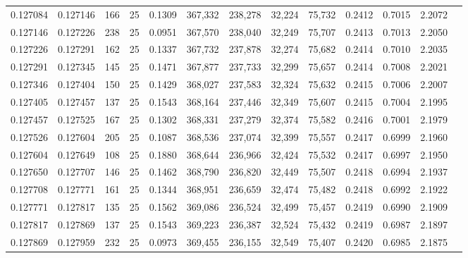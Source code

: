 \begin{tabular}{rrrrrrrrrrrrr}
0.127084 & 0.127146 &   166 &  25 &                                     0.1309 & 367,332 & 238,278 &  32,224 &  75,732 & 0.2412 & 0.7015 & 2.2072 \\
0.127146 & 0.127226 &   238 &  25 &                                     0.0951 & 367,570 & 238,040 &  32,249 &  75,707 & 0.2413 & 0.7013 & 2.2050 \\
0.127226 & 0.127291 &   162 &  25 &                                     0.1337 & 367,732 & 237,878 &  32,274 &  75,682 & 0.2414 & 0.7010 & 2.2035 \\
0.127291 & 0.127345 &   145 &  25 &                                     0.1471 & 367,877 & 237,733 &  32,299 &  75,657 & 0.2414 & 0.7008 & 2.2021 \\
0.127346 & 0.127404 &   150 &  25 &                                     0.1429 & 368,027 & 237,583 &  32,324 &  75,632 & 0.2415 & 0.7006 & 2.2007 \\
0.127405 & 0.127457 &   137 &  25 &                                     0.1543 & 368,164 & 237,446 &  32,349 &  75,607 & 0.2415 & 0.7004 & 2.1995 \\
0.127457 & 0.127525 &   167 &  25 &                                     0.1302 & 368,331 & 237,279 &  32,374 &  75,582 & 0.2416 & 0.7001 & 2.1979 \\
0.127526 & 0.127604 &   205 &  25 &                                     0.1087 & 368,536 & 237,074 &  32,399 &  75,557 & 0.2417 & 0.6999 & 2.1960 \\
0.127604 & 0.127649 &   108 &  25 &                                     0.1880 & 368,644 & 236,966 &  32,424 &  75,532 & 0.2417 & 0.6997 & 2.1950 \\
0.127650 & 0.127707 &   146 &  25 &                                     0.1462 & 368,790 & 236,820 &  32,449 &  75,507 & 0.2418 & 0.6994 & 2.1937 \\
0.127708 & 0.127771 &   161 &  25 &                                     0.1344 & 368,951 & 236,659 &  32,474 &  75,482 & 0.2418 & 0.6992 & 2.1922 \\
0.127771 & 0.127817 &   135 &  25 &                                     0.1562 & 369,086 & 236,524 &  32,499 &  75,457 & 0.2419 & 0.6990 & 2.1909 \\
0.127817 & 0.127869 &   137 &  25 &                                     0.1543 & 369,223 & 236,387 &  32,524 &  75,432 & 0.2419 & 0.6987 & 2.1897 \\
0.127869 & 0.127959 &   232 &  25 &                                     0.0973 & 369,455 & 236,155 &  32,549 &  75,407 & 0.2420 & 0.6985 & 2.1875 \\

\end{tabular}
